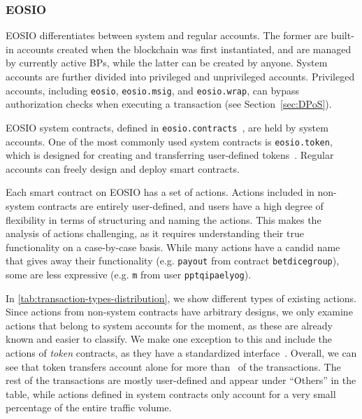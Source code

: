 \subsubsection{EOSIO}
EOSIO differentiates between system and regular accounts.
The former are built-in accounts created when the blockchain was first instantiated, and are managed by currently active BPs, while the latter can be created by anyone.
System accounts are further divided into privileged and unprivileged accounts. 
Privileged accounts, including \texttt{eosio}, \texttt{eosio.msig}, and \texttt{eosio.wrap}, can bypass authorization checks when executing a transaction \cite{EOSIO2019, Kauffman2019} (see Section~\ref{sec:DPoS}).

EOSIO system contracts, defined in \texttt{eosio.contracts}~\cite{EOSIO2020}, are held by system accounts. 
One of the most commonly used system contracts is \texttt{eosio.token}, which is designed for creating and transferring user-defined tokens~\cite{EOSIO2019}.
Regular accounts can freely design and deploy smart contracts. 

Each smart contract on EOSIO has a set of actions. 
Actions included in non-system contracts are entirely user-defined, and users have a high degree of flexibility in terms of structuring and naming the actions. 
This makes the analysis of actions challenging, as it requires understanding their true functionality on a case-by-case basis. 
While many actions have a candid name that gives away their functionality (e.g. \texttt{payout} from contract \texttt{betdicegroup}), some are less expressive (e.g. \texttt{m} from user \texttt{pptqipaelyog}).

In \autoref{tab:transaction-types-distribution}, we show different types of existing actions. 
Since actions from non-system contracts have arbitrary designs, we only examine actions that belong to system accounts for the moment, as these are already known and easier to classify. We make one exception to this and include the actions of \emph{token} contracts, as they have a standardized interface~\cite{eosio-tokens}.
Overall, we can see that token transfers account alone for more than~ of the transactions. The rest of the transactions are mostly user-defined and appear under ``Others'' in the table, while actions defined in system contracts only account for a very small percentage of the entire traffic volume.


